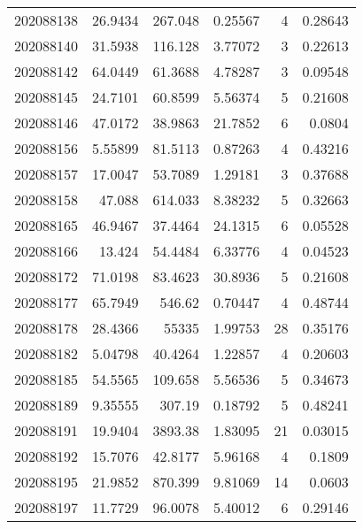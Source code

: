 \begin{tabular}{rrrrrr}
 202088138 &         26.9434  &      267.048  &            0.25567 &           4 & 0.28643 \\
 202088140 &         31.5938  &      116.128  &            3.77072 &           3 & 0.22613 \\
 202088142 &         64.0449  &       61.3688 &            4.78287 &           3 & 0.09548 \\
 202088145 &         24.7101  &       60.8599 &            5.56374 &           5 & 0.21608 \\
 202088146 &         47.0172  &       38.9863 &           21.7852  &           6 & 0.0804  \\
 202088156 &          5.55899 &       81.5113 &            0.87263 &           4 & 0.43216 \\
 202088157 &         17.0047  &       53.7089 &            1.29181 &           3 & 0.37688 \\
 202088158 &         47.088   &      614.033  &            8.38232 &           5 & 0.32663 \\
 202088165 &         46.9467  &       37.4464 &           24.1315  &           6 & 0.05528 \\
 202088166 &         13.424   &       54.4484 &            6.33776 &           4 & 0.04523 \\
 202088172 &         71.0198  &       83.4623 &           30.8936  &           5 & 0.21608 \\
 202088177 &         65.7949  &      546.62   &            0.70447 &           4 & 0.48744 \\
 202088178 &         28.4366  &    55335      &            1.99753 &          28 & 0.35176 \\
 202088182 &          5.04798 &       40.4264 &            1.22857 &           4 & 0.20603 \\
 202088185 &         54.5565  &      109.658  &            5.56536 &           5 & 0.34673 \\
 202088189 &          9.35555 &      307.19   &            0.18792 &           5 & 0.48241 \\
 202088191 &         19.9404  &     3893.38   &            1.83095 &          21 & 0.03015 \\
 202088192 &         15.7076  &       42.8177 &            5.96168 &           4 & 0.1809  \\
 202088195 &         21.9852  &      870.399  &            9.81069 &          14 & 0.0603  \\
 202088197 &         11.7729  &       96.0078 &            5.40012 &           6 & 0.29146 \\

\end{tabular}
